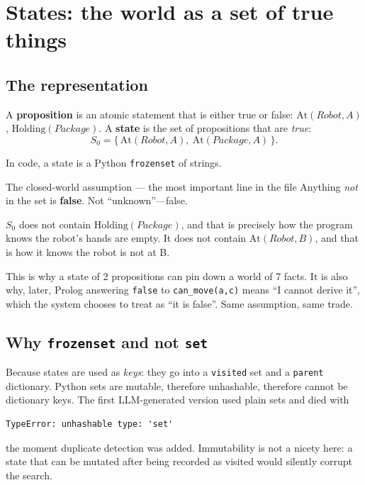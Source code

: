 \documentclass[11pt,a4paper]{article}
\begin{document}
\section{States: the world as a set of true things}

\subsection{The representation}

A \textbf{proposition} is an atomic statement that is either true or false:
$\mathrm{At}(Robot, A)$, $\mathrm{Holding}(Package)$. A \textbf{state} is the
set of propositions that are \emph{true}:
\[
  S_0 = \{\, \mathrm{At}(Robot,A),\ \mathrm{At}(Package,A) \,\}.
\]

In code, a state is a Python \texttt{frozenset} of strings.

\begin{warnbox}{The closed-world assumption --- the most important line in the file}
Anything \emph{not} in the set is \textbf{false}. Not ``unknown''---false.

$S_0$ does not contain $\mathrm{Holding}(Package)$, and that is precisely how
the program knows the robot's hands are empty. It does not contain
$\mathrm{At}(Robot,B)$, and that is how it knows the robot is not at B.

This is why a state of 2 propositions can pin down a world of 7 facts. It is
also why, later, Prolog answering \texttt{false} to \texttt{can\_move(a,c)}
means ``I cannot derive it'', which the system chooses to treat as ``it is
false''. Same assumption, same trade.
\end{warnbox}

\subsection{Why \texttt{frozenset} and not \texttt{set}}

Because states are used as \emph{keys}: they go into a \texttt{visited} set and
a \texttt{parent} dictionary. Python sets are mutable, therefore unhashable,
therefore cannot be dictionary keys. The first LLM-generated version used plain
sets and died with
\begin{lstlisting}
TypeError: unhashable type: 'set'
\end{lstlisting}
the moment duplicate detection was added. Immutability is not a nicety here: a
state that can be mutated after being recorded as visited would silently corrupt
the search.
\end{document}
